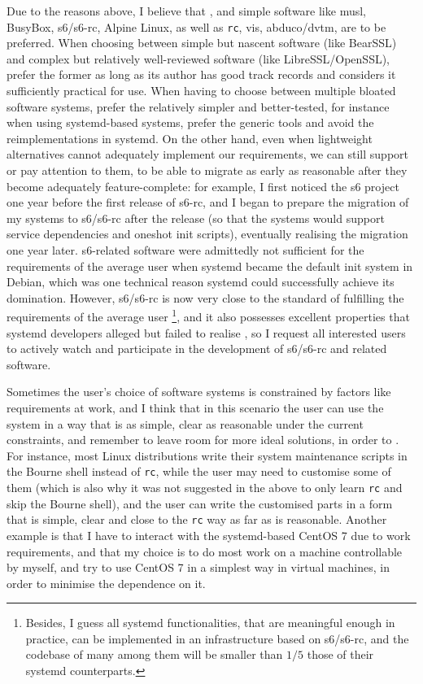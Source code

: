 Due to the reasons above, I believe that ,
and simple software like musl, BusyBox, s6/s6-rc, Alpine Linux, as well as
\verb|rc|, vis, abduco/dvtm, are to be preferred.  When choosing between simple
but nascent software (like BearSSL) and complex but relatively well-reviewed
software (like LibreSSL/OpenSSL), prefer the former as long as its author has
good track records and considers it sufficiently practical for use.  When having
to choose between multiple bloated software systems, prefer the relatively simpler
and better-tested, for instance when using systemd-based systems, prefer the
generic tools and avoid the reimplementations in systemd.  On the other hand,
even when lightweight alternatives cannot adequately implement our requirements,
we can still support or pay attention to them, to be able to migrate as early as
reasonable after they become adequately feature-complete: for example, I first
noticed the s6 project one year before the first release of s6-rc, and I began
to prepare the migration of my systems to s6/s6-rc after the release (so that
the systems would support service dependencies and oneshot init scripts),
eventually realising the migration one year later.  s6-related software were
admittedly not sufficient for the requirements of the average user when systemd
became the default init system in Debian, which was one technical reason systemd
could successfully achieve its domination.  However, s6/s6-rc is now very
close to the standard of fulfilling the requirements of the average user%
\footnote{Besides, I guess all systemd
functionalities, that are meaningful enough in practice, can be implemented in
an infrastructure based on s6/s6-rc, and the codebase of many among them will be
smaller than $1/5$ those of their systemd counterparts.}, and it also possesses
excellent properties that systemd developers alleged but failed to realise%
, so I request all interested users to actively
watch and participate in the development of s6/s6-rc and related software.

Sometimes the user's choice of software systems is constrained by factors like
requirements at work, and I think that in this scenario the user can use the
system in a way that is as simple, clear as reasonable under the current
constraints, and remember to leave room for more ideal solutions, in order to
.  For instance,
most Linux distributions write their system maintenance scripts in the Bourne
shell instead of \verb|rc|, while the user may need to customise some of them
(which is also why it was not suggested in the above to only learn \verb|rc|
and skip the Bourne shell), and the user can write the customised parts in
a form that is simple, clear and close to the \verb|rc| way as far as is
reasonable.  Another example is that I have to interact with the systemd-based
CentOS 7 due to work requirements, and that my choice is to do most work on
a machine controllable by myself, and try to use CentOS 7 in a simplest way
in virtual machines, in order to minimise the dependence on it.

